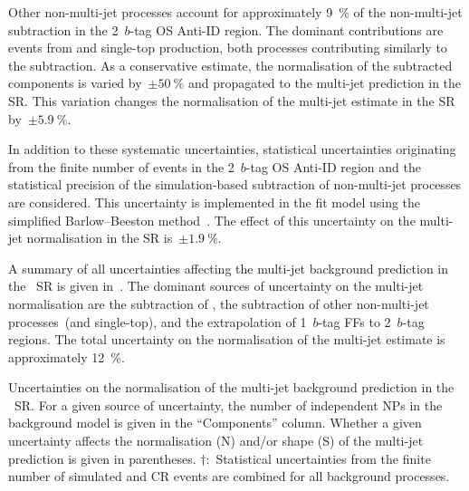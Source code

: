 Other non-multi-jet processes account for approximately \SI{9}{\percent} of the
non-multi-jet subtraction in the 2~$b$-tag OS Anti-ID region. The dominant
contributions are events from \Vjets and single-top production, both processes
contributing similarly to the subtraction. As a conservative estimate, the
normalisation of the subtracted components is varied by~$\pm \SI{50}{\percent}$
and propagated to the multi-jet prediction in the SR. This variation changes the
normalisation of the multi-jet estimate in the SR by~$\pm\SI{5.9}{\percent}$.

In addition to these systematic uncertainties, statistical uncertainties
originating from the finite number of events in the 2~$b$-tag OS Anti-ID region
and the statistical precision of the simulation-based subtraction of
non-multi-jet processes are considered. This uncertainty is implemented in the
fit model using the simplified Barlow--Beeston
method~\cite{barlow1993,conway2011}. The effect of this uncertainty on the
multi-jet normalisation in the SR is~$\pm \SI{1.9}{\percent}$.

A summary of all uncertainties affecting the multi-jet background prediction in
the \hadhad~SR is given in~. The dominant
sources of uncertainty on the multi-jet normalisation are the subtraction of
\ttbarFakes, the subtraction of other non-multi-jet processes~(\Vjets and
single-top), and the extrapolation of 1~$b$-tag FFs to 2~$b$-tag regions. The
total uncertainty on the normalisation of the multi-jet estimate is
approximately \SI{12}{\percent}.

\begin{table}[htbp]
  \centering

  \caption[Uncertainties on the normalisation of the multi-jet background
  prediction in the \hadhad~SR.]{Uncertainties on the normalisation of the
    multi-jet background prediction in the \hadhad~SR. For a given source of
    uncertainty, the number of independent NPs in the background model is given
    in the ``Components'' column. Whether a given uncertainty affects the
    normalisation (N) and/or shape (S) of the multi-jet prediction is given in
    parentheses.  $\dagger$:~Statistical uncertainties from the finite number of
    simulated and CR events are combined for all background processes.}%
  \label{tab:multi_jet_uncertainties}

  
\end{table}


